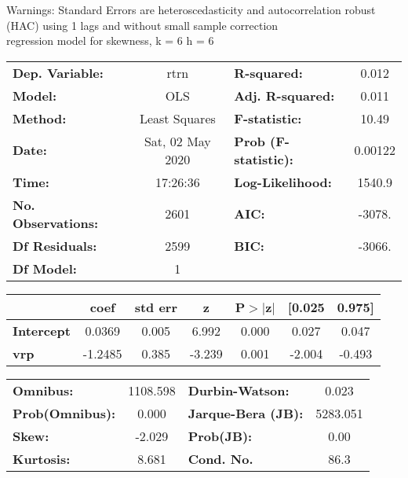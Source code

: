 Warnings: \newline
 [1] Standard Errors are heteroscedasticity and autocorrelation robust (HAC) using 1 lags and without small sample correction\\ 

regression model for skewness, k = 6 h = 6\begin{center}
\begin{tabular}{lclc}
\toprule
\textbf{Dep. Variable:}    &       rtrn       & \textbf{  R-squared:         } &     0.012   \\
\textbf{Model:}            &       OLS        & \textbf{  Adj. R-squared:    } &     0.011   \\
\textbf{Method:}           &  Least Squares   & \textbf{  F-statistic:       } &     10.49   \\
\textbf{Date:}             & Sat, 02 May 2020 & \textbf{  Prob (F-statistic):} &  0.00122    \\
\textbf{Time:}             &     17:26:36     & \textbf{  Log-Likelihood:    } &    1540.9   \\
\textbf{No. Observations:} &        2601      & \textbf{  AIC:               } &    -3078.   \\
\textbf{Df Residuals:}     &        2599      & \textbf{  BIC:               } &    -3066.   \\
\textbf{Df Model:}         &           1      & \textbf{                     } &             \\
\bottomrule
\end{tabular}
\begin{tabular}{lcccccc}
                   & \textbf{coef} & \textbf{std err} & \textbf{z} & \textbf{P$> |$z$|$} & \textbf{[0.025} & \textbf{0.975]}  \\
\midrule
\textbf{Intercept} &       0.0369  &        0.005     &     6.992  &         0.000        &        0.027    &        0.047     \\
\textbf{vrp}       &      -1.2485  &        0.385     &    -3.239  &         0.001        &       -2.004    &       -0.493     \\
\bottomrule
\end{tabular}
\begin{tabular}{lclc}
\textbf{Omnibus:}       & 1108.598 & \textbf{  Durbin-Watson:     } &    0.023  \\
\textbf{Prob(Omnibus):} &   0.000  & \textbf{  Jarque-Bera (JB):  } & 5283.051  \\
\textbf{Skew:}          &  -2.029  & \textbf{  Prob(JB):          } &     0.00  \\
\textbf{Kurtosis:}      &   8.681  & \textbf{  Cond. No.          } &     86.3  \\
\bottomrule
\end{tabular}
\end{center}

